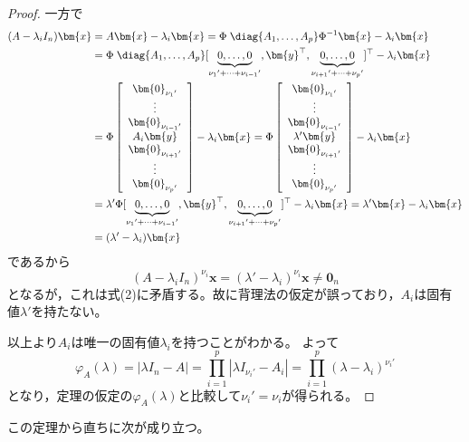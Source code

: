 \begin{proof}
                一方で
                \begin{align*}
                    (A-\lambda_iI_n)\bm{x} &= A\bm{x} - \lambda_i\bm{x} = \Phi\;\diag{A_1,\dotsc,A_p}\Phi^{-1}\bm{x} - \lambda_i\bm{x}\\
                    &= \Phi\;\diag{A_1,\dotsc,A_p}[\underbrace{0,\dotsc,0}_{{\nu_1}'+\dotsb+{\nu_{i-1}}'},\bm{y}^\top,\underbrace{0,\dotsc,0}_{{\nu_{i+1}}'+\dotsb+{\nu_p}'}]^\top - \lambda_i\bm{x}\\
                    &= \Phi\left[
                        \begin{array}{c}
                            \bm{0}_{{\nu_1}'}\\
                            \vdots\\
                            \bm{0}_{{\nu_{i-1}}'}\\
                            A_i\bm{y}\\
                            \bm{0}_{{\nu_{i+1}}'}\\
                            \vdots\\
                            \bm{0}_{{\nu_p}'}\\
                        \end{array}
                    \right] - \lambda_i\bm{x} = \Phi\left[
                        \begin{array}{c}
                            \bm{0}_{{\nu_1}'}\\
                            \vdots\\
                            \bm{0}_{{\nu_{i-1}}'}\\
                            \lambda'\bm{y}\\
                            \bm{0}_{{\nu_{i+1}}'}\\
                            \vdots\\
                            \bm{0}_{{\nu_p}'}\\
                        \end{array}
                    \right] - \lambda_i\bm{x}\\
                    &= \lambda'\Phi[\underbrace{0,\dotsc,0}_{{\nu_1}'+\dotsb+{\nu_{i-1}}'},\bm{y}^\top,\underbrace{0,\dotsc,0}_{{\nu_{i+1}}'+\dotsb+{\nu_p}'}]^\top - \lambda_i\bm{x} = \lambda'\bm{x}-\lambda_i\bm{x}\\
                    &= (\lambda'-\lambda_i)\bm{x}
                \end{align*}
                であるから
                \[(A-\lambda_iI_n)^{\nu_i}\bm{x} = (\lambda'-\lambda_i)^{\nu_i}\bm{x} \neq \bm{0}_n\]
                となるが，これは式(2)に矛盾する。故に背理法の仮定が誤っており，$A_i$は固有値$\lambda'$を持たない。
                \par
                以上より$A_i$は唯一の固有値$\lambda_i$を持つことがわかる。
                よって
                \[\varphi_A(\lambda) = |\lambda I_n - A| = \prod_{i=1}^{p}{|\lambda I_{{\nu_i}'} - A_i|} = \prod_{i=1}^{p}{(\lambda-\lambda_i)^{{\nu_i}'}}\]
                となり，定理の仮定の$\varphi_A(\lambda)$と比較して${\nu_i}'=\nu_i$が得られる。
            \end{proof}
        この定理から直ちに次が成り立つ。
